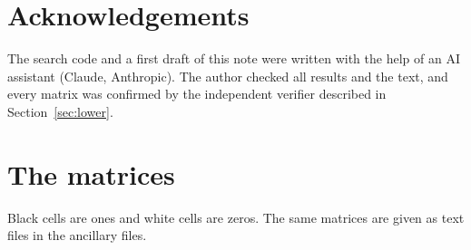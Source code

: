 \documentclass[11pt]{article}
\begin{document}
\section*{Acknowledgements}
The search code and a first draft of this note were written with the help
of an AI assistant (Claude, Anthropic). The author checked all results and
the text, and every matrix was confirmed by the independent verifier
described in Section~\ref{sec:lower}.




\appendix

\section{The matrices}\label{app:matrices}

Black cells are ones and white cells are zeros. The same matrices are given
as text files in the ancillary files.

\medskip

\end{document}
